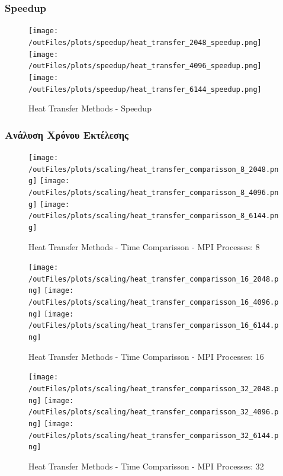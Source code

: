 \documentclass[../final_report.tex]{subfiles}
\begin{document}
\subsubsection{Speedup}

\begin{figure}[H]
    \centering
    \texttt{[image: /outFiles/plots/speedup/heat\_transfer\_2048\_speedup.png]}
    \texttt{[image: /outFiles/plots/speedup/heat\_transfer\_4096\_speedup.png]}
    \texttt{[image: /outFiles/plots/speedup/heat\_transfer\_6144\_speedup.png]}
    \caption{Heat Transfer Methods - Speedup}
    \label{fig:Heat Transfer MPI - Speedup}
\end{figure}

\subsubsection{Ανάλυση Χρόνου Εκτέλεσης}

\begin{figure}[H]
    \centering
    \texttt{[image: /outFiles/plots/scaling/heat\_transfer\_comparisson\_8\_2048.png]}
    \texttt{[image: /outFiles/plots/scaling/heat\_transfer\_comparisson\_8\_4096.png]}
    \texttt{[image: /outFiles/plots/scaling/heat\_transfer\_comparisson\_8\_6144.png]}
    \caption{Heat Transfer Methods - Time Comparisson - MPI Processes: 8}
    \label{fig:Heat Transfer Methods - Time Comparisson - MPI Processes: 8}
\end{figure}

\begin{figure}[H]
    \centering
    \texttt{[image: /outFiles/plots/scaling/heat\_transfer\_comparisson\_16\_2048.png]}
    \texttt{[image: /outFiles/plots/scaling/heat\_transfer\_comparisson\_16\_4096.png]}
    \texttt{[image: /outFiles/plots/scaling/heat\_transfer\_comparisson\_16\_6144.png]}
    \caption{Heat Transfer Methods - Time Comparisson - MPI Processes: 16}
    \label{fig:Heat Transfer Methods - Time Comparisson - MPI Processes: 16}
\end{figure}

\begin{figure}[H]
    \centering
    \texttt{[image: /outFiles/plots/scaling/heat\_transfer\_comparisson\_32\_2048.png]}
    \texttt{[image: /outFiles/plots/scaling/heat\_transfer\_comparisson\_32\_4096.png]}
    \texttt{[image: /outFiles/plots/scaling/heat\_transfer\_comparisson\_32\_6144.png]}
    \caption{Heat Transfer Methods - Time Comparisson - MPI Processes: 32}
    \label{fig:Heat Transfer Methods - Time Comparisson - MPI Processes: 32}
\end{figure}
\end{document}
